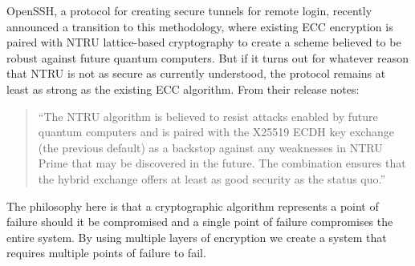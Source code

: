 OpenSSH, a protocol for creating secure tunnels for remote login, recently announced \cite{bib:OpenSSH} a transition to this methodology, where existing ECC encryption is paired with NTRU lattice-based cryptography to create a scheme believed to be robust against future quantum computers. But if it turns out for whatever reason that NTRU is not as secure as currently understood, the protocol remains at least as strong as the existing ECC algorithm. From their release notes:

\begin{quote}
``The NTRU algorithm is believed to resist attacks enabled by future quantum computers and is paired with the X25519 ECDH key exchange (the previous default) as a backstop against any weaknesses in NTRU Prime that may be discovered in the future. The combination ensures that the hybrid exchange offers at least as good security as the status quo.''
\end{quote}

The philosophy here is that a cryptographic algorithm represents a point of failure should it be compromised and a single point of failure compromises the entire system. By using multiple layers of encryption we create a system that requires multiple points of failure to fail.